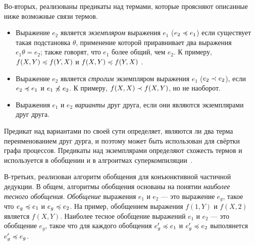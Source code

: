 
Во-вторых, реализованы предикаты над термами, которые проясняют описанные ниже возможные связи термов.
\begin{itemize}
\item Выражение $e_2$ является \emph{экземпляром} выражения $e_1$ ($e_2 \preccurlyeq e_1$)
если существует такая подстановка $\theta$, применение которой приравнивает
два выражения $e_1 \theta = e_2$; также говорят, что $e_1$ более общий, чем $e_2$.
К примеру, $f(X, Y) \preccurlyeq f(Y, X)$ и $f(X, Y) \preccurlyeq f(Y, X)$ .
\item Выражение $e_2$ является \emph{строгим} экземпляром выражения $e_1$ ($e_2 \prec e_2$), если
$e_2 \preccurlyeq e_1$ и $e_1 \not\preccurlyeq e_2$. К примеру, $f(X, X) \prec f(X, Y)$, но не наоборот.
\item Выражения $e_1$ и $e_2$ \emph{варианты} друг друга, если они являются экземплярами друг друга.
\end{itemize}

Предикат над вариантами по своей сути определяет, являются ли два терма переименованием друг дурга,
и поэтому может быть использован для свёртки графа процессов. Предикаты над экземплярами определяют
схожесть термов и используется в обобщении и в алгроитмах суперкомпиляции~\cite{scPos}.


В-третьих, реализован алгоритм обобщения для конъюнктивной частичной дедукции.
В общем, алгоритмы обобщения основаны на понятии \emph{наиболее тесного обобщения}.
\emph{Обобщение} выражения $e_1$ и $e_2$ --- это выражение $e_g$, такое что
$e_g \preccurlyeq e_1$  и $e_g \preccurlyeq e_2$. На пример, обобщением выражения
$f(1, Y)$ и $f(X, 2)$ является $f(X, Y)$.
Наиболее тесное обобщение 
выражений $e_1$ и $e_2$ --- это обобщение $e_g$, такое что
для каждого обобщения $e_g' \preccurlyeq e_1$ и $e_g' \preccurlyeq e_2$ выполянется $e_g' \preccurlyeq e_g$\cite{scPos}.


